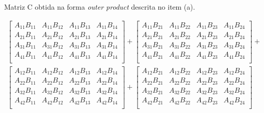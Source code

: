 \begin{questions}
\begin{parts}
        Matriz C obtida na forma \textit{outer product} descrita no item (a).
        \begin{solution}
            \[
            \begin{split}
                \begin{bmatrix}
                    A_{11} B_{11} & A_{11} B_{12} & A_{11} B_{13} & A_{11} B_{14} \\
                    A_{21} B_{11} & A_{21} B_{12} & A_{21} B_{13} & A_{21} B_{14} \\
                    A_{31} B_{11} & A_{31} B_{12} & A_{31} B_{13} & A_{31} B_{14} \\
                    A_{41} B_{11} & A_{41} B_{12} & A_{41} B_{13} & A_{41} B_{14} \\
                \end{bmatrix} + \begin{bmatrix}
                    A_{11} B_{21} & A_{11} B_{22} & A_{11} B_{23} & A_{11} B_{24} \\
                    A_{21} B_{21} & A_{21} B_{22} & A_{21} B_{23} & A_{21} B_{24} \\
                    A_{31} B_{21} & A_{31} B_{22} & A_{31} B_{23} & A_{31} B_{24} \\
                    A_{41} B_{21} & A_{41} B_{22} & A_{41} B_{23} & A_{41} B_{24} \\
                \end{bmatrix} + \\ \begin{bmatrix}
                    A_{12} B_{11} & A_{12} B_{12} & A_{12} B_{13} & A_{12} B_{14} \\
                    A_{22} B_{11} & A_{22} B_{12} & A_{22} B_{13} & A_{22} B_{14} \\
                    A_{32} B_{11} & A_{32} B_{12} & A_{32} B_{13} & A_{32} B_{14} \\
                    A_{42} B_{11} & A_{42} B_{12} & A_{42} B_{13} & A_{42} B_{14} \\
                \end{bmatrix} + \begin{bmatrix}
                    A_{12} B_{21} & A_{12} B_{22} & A_{12} B_{23} & A_{12} B_{24} \\
                    A_{22} B_{21} & A_{22} B_{22} & A_{22} B_{23} & A_{22} B_{24} \\
                    A_{32} B_{21} & A_{32} B_{22} & A_{32} B_{23} & A_{32} B_{24} \\
                    A_{42} B_{21} & A_{42} B_{22} & A_{42} B_{23} & A_{42} B_{24} \\
                \end{bmatrix} 
            \end{split}
            \]
        \end{solution}
    \end{parts}


\end{questions}
